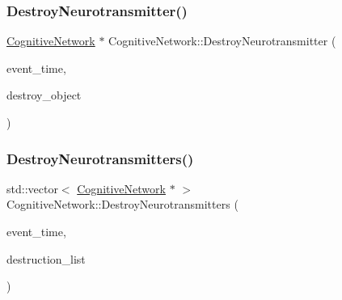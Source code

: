 \mbox{\label{classCognitiveNetwork_a0f943978df49ef879c43c15c81682a8a}} 
\subsubsection{\texorpdfstring{Destroy\+Neurotransmitter()}{DestroyNeurotransmitter()}}
{\footnotesize\ttfamily \mbox{\hyperlink{classCognitiveNetwork}{Cognitive\+Network}} $\ast$ Cognitive\+Network\+::\+Destroy\+Neurotransmitter (\begin{DoxyParamCaption}\item[{std\+::chrono\+::time\+\_\+point$<$ \mbox{\hyperlink{universe_8h_a0ef8d951d1ca5ab3cfaf7ab4c7a6fd80}{Clock}} $>$}]{event\+\_\+time,  }\item[{\mbox{\hyperlink{classCognitiveNetwork}{Cognitive\+Network}} $\ast$}]{destroy\+\_\+object }\end{DoxyParamCaption})}

\mbox{\label{classCognitiveNetwork_a7f705e562562e9778ee0b5260dda9f09}} 
\subsubsection{\texorpdfstring{Destroy\+Neurotransmitters()}{DestroyNeurotransmitters()}}
{\footnotesize\ttfamily std\+::vector$<$ \mbox{\hyperlink{classCognitiveNetwork}{Cognitive\+Network}} $\ast$ $>$ Cognitive\+Network\+::\+Destroy\+Neurotransmitters (\begin{DoxyParamCaption}\item[{std\+::chrono\+::time\+\_\+point$<$ \mbox{\hyperlink{universe_8h_a0ef8d951d1ca5ab3cfaf7ab4c7a6fd80}{Clock}} $>$}]{event\+\_\+time,  }\item[{std\+::vector$<$ \mbox{\hyperlink{classCognitiveNetwork}{Cognitive\+Network}} $\ast$$>$}]{destruction\+\_\+list }\end{DoxyParamCaption})}

\mbox{\label{classCognitiveNetwork_aefecb3a2464f7f21449e522af5119c63}} 
